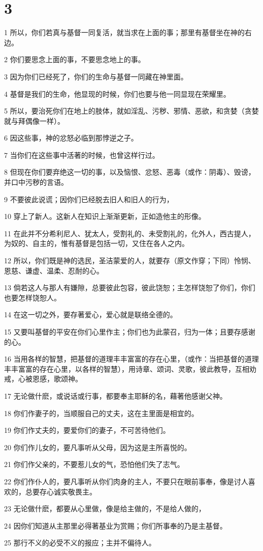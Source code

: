 \chapter{3}

\par 1 所以，你们若真与基督一同复活，就当求在上面的事；那里有基督坐在神的右边。
\par 2 你们要思念上面的事，不要思念地上的事。
\par 3 因为你们已经死了，你们的生命与基督一同藏在神里面。
\par 4 基督是我们的生命，他显现的时候，你们也要与他一同显现在荣耀里。
\par 5 所以，要治死你们在地上的肢体，就如淫乱、污秽、邪情、恶欲，和贪婪（贪婪就与拜偶像一样）。
\par 6 因这些事，神的忿怒必临到那悖逆之子。
\par 7 当你们在这些事中活著的时候，也曾这样行过。
\par 8 但现在你们要弃绝这一切的事，以及恼恨、忿怒、恶毒（或作：阴毒）、毁谤，并口中污秽的言语。
\par 9 不要彼此说谎；因你们已经脱去旧人和旧人的行为，
\par 10 穿上了新人。这新人在知识上渐渐更新，正如造他主的形像。
\par 11 在此并不分希利尼人、犹太人，受割礼的、未受割礼的，化外人，西古提人，为奴的、自主的，惟有基督是包括一切，又住在各人之内。
\par 12 所以，你们既是神的选民，圣洁蒙爱的人，就要存（原文作穿；下同）怜悯、恩慈、谦虚、温柔、忍耐的心。
\par 13 倘若这人与那人有嫌隙，总要彼此包容，彼此饶恕；主怎样饶恕了你们，你们也要怎样饶恕人。
\par 14 在这一切之外，要存著爱心，爱心就是联络全德的。
\par 15 又要叫基督的平安在你们心里作主；你们也为此蒙召，归为一体；且要存感谢的心。
\par 16 当用各样的智慧，把基督的道理丰丰富富的存在心里，（或作：当把基督的道理丰丰富富的存在心里，以各样的智慧），用诗章、颂词、灵歌，彼此教导，互相劝戒，心被恩感，歌颂神。
\par 17 无论做什麽，或说话或行事，都要奉主耶稣的名，藉著他感谢父神。
\par 18 你们作妻子的，当顺服自己的丈夫，这在主里面是相宜的。
\par 19 你们作丈夫的，要爱你们的妻子，不可苦待他们。
\par 20 你们作儿女的，要凡事听从父母，因为这是主所喜悦的。
\par 21 你们作父亲的，不要惹儿女的气，恐怕他们失了志气。
\par 22 你们作仆人的，要凡事听从你们肉身的主人，不要只在眼前事奉，像是讨人喜欢的，总要存心诚实敬畏主。
\par 23 无论做什麽，都要从心里做，像是给主做的，不是给人做的，
\par 24 因你们知道从主那里必得著基业为赏赐；你们所事奉的乃是主基督。
\par 25 那行不义的必受不义的报应；主并不偏待人。

